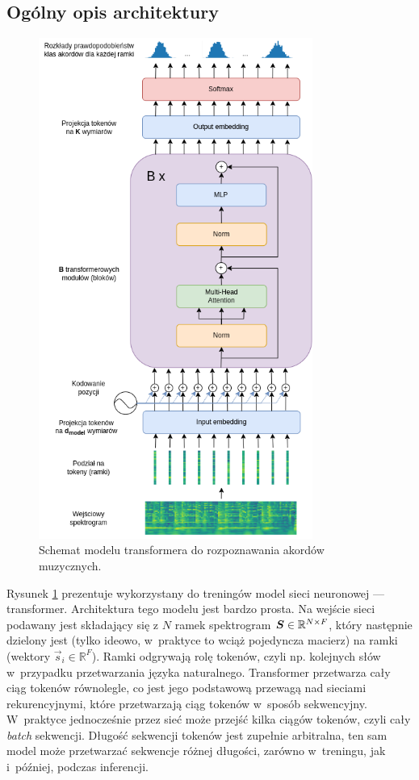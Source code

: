\subsection{Ogólny opis architektury}

\begin{figure}
    \centering
    \includegraphics[width=0.8\textwidth]{./images/transformer.png}
    \caption{Schemat modelu transformera do rozpoznawania akordów muzycznych.}
    \label{fig:transformer}
\end{figure}

Rysunek \ref{fig:transformer} prezentuje wykorzystany do treningów model sieci neuronowej --- transformer. Architektura tego modelu jest bardzo prosta. Na wejście sieci podawany jest składający się z $N$ ramek spektrogram $\boldsymbol{S} \in \mathbb{R}^{N \times F}$, który następnie dzielony jest (tylko ideowo, w~praktyce to wciąż pojedyncza macierz) na ramki (wektory $\vec s_i \in \mathbb{R}^F$). Ramki odgrywają rolę tokenów, czyli np. kolejnych słów w~przypadku przetwarzania języka naturalnego. Transformer przetwarza cały ciąg tokenów równolegle, co jest jego podstawową przewagą nad sieciami rekurencyjnymi, które przetwarzają ciąg tokenów w~sposób sekwencyjny. W~praktyce jednocześnie przez sieć może przejść kilka ciągów tokenów, czyli cały \emph{batch} sekwencji. Długość sekwencji tokenów jest zupełnie arbitralna, ten sam model może przetwarzać sekwencje różnej długości, zarówno w~treningu, jak i~później, podczas inferencji.

